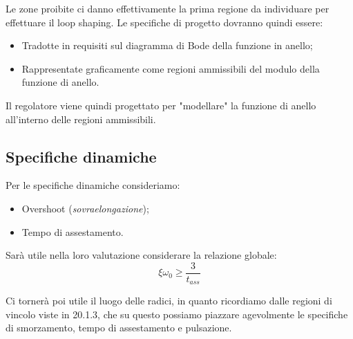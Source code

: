 \documentclass[a4paper,11pt]{article}
\begin{document}
Le zone proibite ci danno effettivamente la prima regione da individuare per effettuare il loop shaping.
Le specifiche di progetto dovranno quindi essere:
\begin{itemize}
	\item Tradotte in requisiti sul diagramma di Bode della funzione in anello;
	\item Rappresentate graficamente come regioni ammissibili del modulo della funzione di anello.
\end{itemize}

Il regolatore viene quindi progettato per "modellare" la funzione di anello all'interno delle regioni ammissibili.

\subsection{Specifiche dinamiche}
Per le specifiche dinamiche consideriamo:
\begin{itemize}
	\item Overshoot (\textit{sovraelongazione});
	\item Tempo di assestamento.
\end{itemize}

Sarà utile nella loro valutazione considerare la relazione globale:
$$
\xi \omega_0 \geq \frac{3}{t_{ass}}
$$

Ci tornerà poi utile il luogo delle radici, in quanto ricordiamo dalle regioni di vincolo viste in 20.1.3, che su questo possiamo piazzare agevolmente le specifiche di smorzamento, tempo di assestamento e pulsazione.
\end{document}
